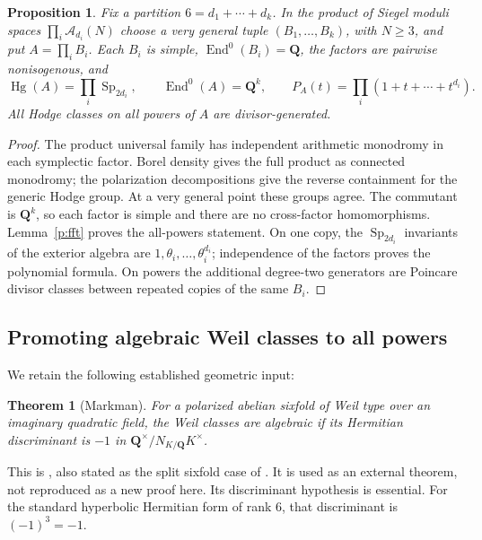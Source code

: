 \documentclass[11pt,reqno]{article}
\theoremstyle{emphasizedplain}
\theoremstyle{emphasizeddefinition}
\theoremstyle{emphasizeddefinition}
\newtheorem{pretheorem}[prelemma]{Theorem}
\newtheorem{preproposition}[prelemma]{Proposition}
\DeclareMathOperator{\End}{End}
\DeclareMathOperator{\Hg}{Hg}
\DeclareMathOperator{\Sp}{Sp}
\newcommand{\Q}{\mathbf Q}
\begin{document}
\begin{preproposition}\label{p:products}
Fix a partition $6=d_1+\cdots+d_k$. In the product of Siegel moduli spaces
$\prod_i\mathcal A_{d_i}(N)$ choose a very general tuple $(B_1,\ldots,B_k)$,
with $N\geq3$, and put $A=\prod_i B_i$. Each $B_i$ is simple,
$\End^0(B_i)=\Q$, the factors are pairwise nonisogenous, and
\[
 \Hg(A)=\prod_i\Sp_{2d_i},\qquad
 \End^0(A)=\Q^k,\qquad
 P_A(t)=\prod_i(1+t+\cdots+t^{d_i}).
\]
All Hodge classes on all powers of $A$ are divisor-generated.
\end{preproposition}
\begin{proof}
The product universal family has independent arithmetic monodromy in each
symplectic factor. Borel density gives the full product as connected
monodromy; the polarization decompositions give the reverse containment
for the generic Hodge group. At a very general point these groups agree.
The commutant is $\Q^k$, so each factor is simple and there are no
cross-factor homomorphisms. Lemma~\ref{p:fft} proves the all-powers statement.
On one copy, the $\Sp_{2d_i}$ invariants of the exterior algebra are
$1,\theta_i,\ldots,\theta_i^{d_i}$; independence of the factors proves the
polynomial formula. On powers the additional degree-two generators are
Poincare divisor classes between repeated copies of the same $B_i$.
\end{proof}

\subsection*{Promoting algebraic Weil classes to all powers}
We retain the following established geometric input:
\begin{pretheorem}[Markman]\label{p:markman}
For a polarized abelian sixfold of Weil type over an imaginary quadratic
field, the Weil classes are algebraic if its Hermitian discriminant is
$-1$ in $\Q^\times/N_{K/\Q}K^\times$.
\end{pretheorem}
This is \cite[Theorem 1.5.1]{Markman}, also stated as the split sixfold case
of \cite[Theorem 1.2]{MarkmanSurvey}. It is used as an external theorem,
not reproduced as a new proof here. Its discriminant hypothesis is essential.
For the standard hyperbolic Hermitian form of rank $6$, that discriminant
is $(-1)^3=-1$.
\end{document}

